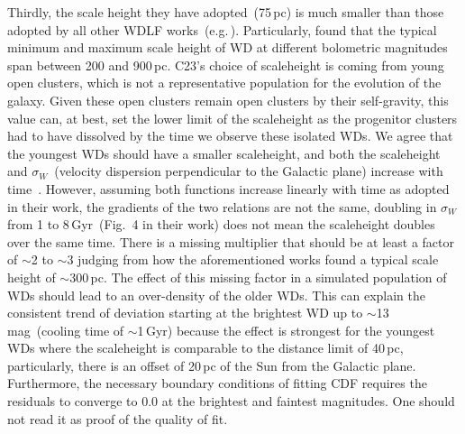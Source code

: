 \documentclass[fleqn,usenatbib]{mnras}
\begin{document}
{%

Thirdly, the scale height they have adopted~(75\,pc) is much smaller than those
adopted by all other WDLF works~(e.g.\,\mbox{\citealt{2006AJ....131..571H,
2011MNRAS.417...93R, 2019MNRAS.482..715L}}). Particularly,
\mbox{\citet{2006AJ....131..571H}} found that the typical minimum and maximum scale
height of WD at different bolometric magnitudes span between 200 and 900\,pc.
C23's choice of scaleheight is coming from young open clusters, which is not
a representative population for the evolution of the galaxy. Given these open
clusters remain open clusters by their self-gravity, this value can, at best,
set the lower limit of the scaleheight as the progenitor clusters had to have
dissolved by the time we observe these isolated WDs. We agree that the youngest
WDs should have a smaller scaleheight, and both the scaleheight and
$\sigma_W$~(velocity dispersion perpendicular to the Galactic plane) increase
with time~\mbox{\citep{2019MNRAS.484.3544R}}. However, assuming both functions
increase linearly with time as adopted in their work, the gradients of the two
relations are not the same, doubling in $\sigma_W$ from 1 to 8\,Gyr~(Fig.~4 in
their work) does not mean the scaleheight doubles over the same time. There is
a missing multiplier that should be at least a factor of $\sim$2 to $\sim$3
judging from how the aforementioned works found a typical scale height of
$\sim$300\,pc. The effect of this missing factor in a simulated population of
WDs should lead to an over-density of the older WDs. This can explain the
consistent trend of deviation starting at the brightest WD up to
$\sim$13\,mag~(cooling time of $\sim$1\,Gyr) because the effect is strongest
for the youngest WDs where the scaleheight is comparable to the distance limit
of 40\,pc, particularly, there is an offset of 20\,pc of the Sun from the
Galactic plane. Furthermore, the necessary boundary conditions of fitting
CDF requires the residuals to converge to 0.0 at the brightest and faintest
magnitudes. One should not read it as proof of the quality of fit.
}
\end{document}
